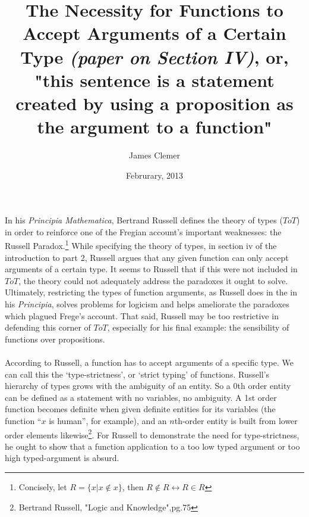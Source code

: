 \documentclass{article}
\begin{document}
\title{The Necessity for Functions to Accept Arguments of a Certain Type \textit{(paper on Section IV)}, or, "this sentence is a statement created by using a proposition as the argument to a function"}
\author{James Clemer}
\date{Februrary, 2013}

\maketitle 

\paragraph{}
In his \textit{Principia Mathematica}, Bertrand Russell defines the theory of types ($ToT$) in order to reinforce one of the Fregian account's important weaknesses: the Russell Paradox.\footnote[1]{Concisely, let $R=\{x|x\not\in x\}$, then $R \not\in R \longleftrightarrow R \in R$} While specifying the theory of types, in section iv of the introduction to part 2, Russell argues that any given function can only accept arguments of a certain type. It seems to Russell that if this were not included in $ToT$, the theory could not adequately address the paradoxes it ought to solve. Ultimately, restricting the types of function arguments, as Russell does in the in his \textit{Principia}, solves problems for logicism and helps ameliorate the paradoxes which plagued Frege's account. That said, Russell may be too restrictive in defending this corner of $ToT$, especially for his final example: the sensibility of functions over propositions.
\paragraph{}
According to Russell, a function has to accept arguments of a specific type.
We can call this the ‘type-strictness’, or ‘strict typing’ of functions.
Russell’s hierarchy of types grows with the ambiguity of an entity. So a 0th order entity can be defined as a statement with no variables, no ambiguity. A 1st order function becomes definite when given definite entities for its variables (the function “$x$ is human”, for example), and an $n$th-order entity is built from lower order elements likewise\footnote[2]{Bertrand Russell, "Logic and Knowledge",pg.75}.
For Russell to demonstrate the need for type-strictness, he ought to show that a function application to a too low typed argument or too high typed-argument is absurd.
\end{document}
